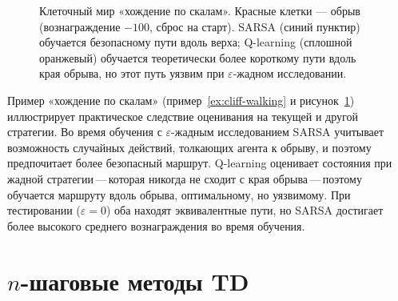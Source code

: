\begin{figure}[ht]
\centering
{}
\caption{Клеточный мир «хождение по скалам».  Красные клетки --- обрыв (вознаграждение $-100$, сброс на старт).  SARSA (синий пунктир) обучается безопасному пути вдоль верха; Q-learning (сплошной оранжевый) обучается теоретически более короткому пути вдоль края обрыва, но этот путь уязвим при $\varepsilon$-жадном исследовании.}
\label{fig:cliff-walking}
\end{figure}

Пример «хождение по скалам» (пример~\ref{ex:cliff-walking} и рисунок~\ref{fig:cliff-walking}) иллюстрирует практическое следствие оценивания на текущей и другой стратегии.  Во время обучения с $\varepsilon$-жадным исследованием SARSA учитывает возможность случайных действий, толкающих агента к обрыву, и поэтому предпочитает более безопасный маршрут.  Q-learning оценивает состояния при жадной стратегии\,---\,которая никогда не сходит с края обрыва\,---\,поэтому обучается маршруту вдоль обрыва, оптимальному, но уязвимому.  При тестировании ($\varepsilon=0$) оба находят эквивалентные пути, но SARSA достигает более высокого среднего вознаграждения во время обучения.

\section{$n$-шаговые методы TD}
\label{sec:nstep-td}

